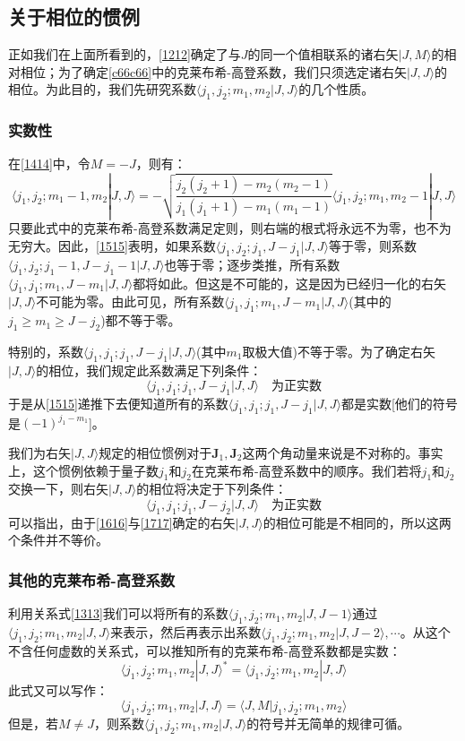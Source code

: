 \documentclass[]{article}
\begin{document}
\subsection{关于相位的惯例}
正如我们在上面所看到的，\eqref{1212}确定了与$J$的同一个值相联系的诸右矢$|J,M\rangle$的相对相位；为了确定\eqref{c66c66}中的克莱布希-高登系数，我们只须选定诸右矢$|J,J\rangle$的相位。为此目的，我们先研究系数$\langle j_1,j_2;m_1,m_2|J,J\rangle$的几个性质。
\subsubsection{实数性}
在\eqref{1414}中，令$M=-J$，则有：
\begin{equation}
	\langle j_1,j_2;m_1-1,m_2|J,J\rangle=-\sqrt{\dfrac{j_2(j_2+1)-m_2(m_2-1)}{j_1(j_1+1)-m_1(m_1-1)}}\langle j_1,j_2;m_1,m_2-1|J,J\rangle
	\label{1515}
\end{equation}
只要此式中的克莱布希-高登系数满足定则，则右端的根式将永远不为零，也不为无穷大。因此，\eqref{1515}表明，如果系数$\langle j_1,j_2;j_1,J-j_1|J,J\rangle$等于零，则系数$\langle j_1,j_2;j_1-1,J-j_1-1|J,J\rangle$也等于零；逐步类推，所有系数$\langle j_1,j_1;m_1,J-m_1|J,J\rangle$都将如此。但这是不可能的，这是因为已经归一化的右矢$|J,J\rangle$不可能为零。由此可见，所有系数$\langle j_1,j_1;m_1,J-m_1|J,J\rangle$(其中的$j_1\geqslant m_1\geqslant J-j_2$)都不等于零。\par 
特别的，系数$\langle j_1,j_1;j_1,J-j_1|J,J\rangle$(其中$m_1$取极大值)不等于零。为了确定右矢$|J,J\rangle$的相位，我们规定此系数满足下列条件：
\begin{equation}
	\langle j_1,j_1;j_1,J-j_1|J,J\rangle\quad\text{为正实数}
	\label{1616}
\end{equation}
于是从\eqref{1515}递推下去便知道所有的系数$\langle j_1,j_1;j_1,J-j_1|J,J\rangle$都是实数[他们的符号是$(-1)^{j_1-m_1}$]。\par 
我们为右矢$|J,J\rangle$规定的相位惯例对于$\boldsymbol{J}_1,\boldsymbol{J}_2$这两个角动量来说是不对称的。事实上，这个惯例依赖于量子数$j_1$和$j_2$在克莱布希-高登系数中的顺序。我们若将$j_1$和$j_2$交换一下，则右矢$|J,J\rangle$的相位将决定于下列条件：
\begin{equation}
	\langle j_1,j_1;j_1,J-j_2|J,J\rangle\quad\text{为正实数}
	\label{1717}
\end{equation}
可以指出，由于\eqref{1616}与\eqref{1717}确定的右矢$|J,J\rangle$的相位可能是不相同的，所以这两个条件并不等价。
\subsubsection{其他的克莱布希-高登系数}
利用关系式\eqref{1313}我们可以将所有的系数$\langle j_1,j_2;m_1,m_2|J,J-1\rangle$通过$\langle j_1,j_2;m_1,m_2|J,J\rangle$来表示，然后再表示出系数$\langle j_1,j_2;m_1,m_2|J,J-2\rangle,\cdots$。从这个不含任何虚数的关系式，可以推知所有的克莱布希-高登系数都是实数：
\begin{equation}
	\langle j_1,j_2;m_1,m_2|J,J\rangle^*=\langle j_1,j_2;m_1,m_2|J,J\rangle
\end{equation}
此式又可以写作：
\begin{equation}
	\langle j_1,j_2;m_1,m_2|J,J\rangle=\langle J,M|j_1,j_2;m_1,m_2\rangle
\end{equation}
但是，若$M\neq J$，则系数$\langle j_1,j_2;m_1,m_2|J,J\rangle$的符号并无简单的规律可循。
\end{document}
